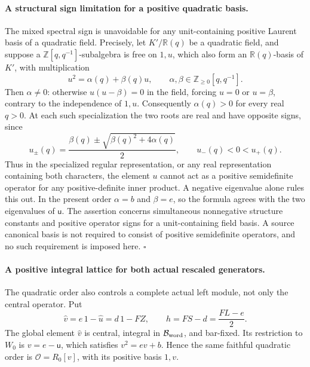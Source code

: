 \paragraph{A structural sign limitation for a positive quadratic basis.}
The mixed spectral sign is unavoidable for any unit-containing
positive Laurent basis of a quadratic field. Precisely, let
$K'/\mathbb R(q)$ be a quadratic field, and suppose a
$\mathbb Z[q,q^{-1}]$-subalgebra is free on $1,u$, which
also form an $\mathbb R(q)$-basis of $K'$, with multiplication
\[
        u^2=\alpha(q)+\beta(q)u,
        \qquad
        \alpha,\beta\in\mathbb Z_{\ge0}[q,q^{-1}].
                                                               \tag{P-F52at}
\]
Then $\alpha\ne0$: otherwise $u(u-\beta)=0$ in the field,
forcing $u=0$ or $u=\beta$, contrary to the independence of
$1,u$. Consequently $\alpha(q)>0$ for every real $q>0$.
At each such specialization the two roots are real and have
opposite signs, since
\[
   u_\pm(q)=\frac{\beta(q)\pm
                     \sqrt{\beta(q)^2+4\alpha(q)}}2,
   \qquad u_-(q)<0<u_+(q).
                                                               \tag{P-F52au}
\]
Thus in the specialized regular representation, or any real
representation containing both characters, the element $u$
cannot act as a positive semidefinite operator for any
positive-definite inner product. A negative eigenvalue
alone rules this out. In the present order $\alpha=b$ and
$\beta=e$, so the formula agrees with the two eigenvalues
of $\mathsf u$. The assertion concerns simultaneous
nonnegative structure constants and positive operator
signs for a unit-containing field basis. A source canonical
basis is not required to consist of positive semidefinite
operators, and no such requirement is imposed here.
\hfill$\square$

\paragraph{A positive integral lattice for both actual rescaled generators.}
The quadratic order also controls a complete actual left module,
not only the central operator. Put
\[
 \widehat v=e\,1-\widehat u=d\,1-FZ,\qquad
 h=FS-d=\frac{FL-e}{2}.
                                                               \tag{P-F52av}
\]
The global element $\widehat v$ is central, integral in
$\mathcal B_{\rm word}$, and bar-fixed. Its restriction to
$W_0$ is $v=e-\mathsf u$, which satisfies
$v^2=ev+b$. Hence the same faithful quadratic order is
$\mathcal O=R_0[v]$, with its positive basis $1,v$.

